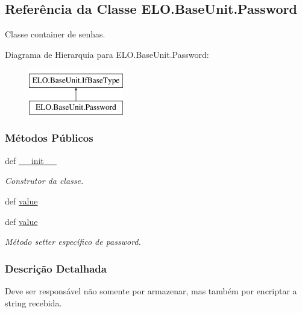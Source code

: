 \hypertarget{classELO_1_1BaseUnit_1_1Password}{\subsection{Referência da Classe E\-L\-O.\-Base\-Unit.\-Password}
\label{classELO_1_1BaseUnit_1_1Password}
}


Classe container de senhas.  


Diagrama de Hierarquia para E\-L\-O.\-Base\-Unit.\-Password\-:\begin{figure}[H]
\begin{center}
\leavevmode
\includegraphics[height=2.000000cm]{d4/df5/classELO_1_1BaseUnit_1_1Password}
\end{center}
\end{figure}
\subsubsection*{Métodos Públicos}
\begin{DoxyCompactItemize}
\item 
def \hyperlink{classELO_1_1BaseUnit_1_1Password_a01568369a90b21117ba3beb05cbf9dfe}{\-\_\-\-\_\-init\-\_\-\-\_\-}
\begin{DoxyCompactList}\small\item\em Construtor da classe. \end{DoxyCompactList}\item 
def \hyperlink{classELO_1_1BaseUnit_1_1Password_a42dcd63788a2eed3780c39f368356546}{value}
\item 
def \hyperlink{classELO_1_1BaseUnit_1_1Password_a42dcd63788a2eed3780c39f368356546}{value}
\begin{DoxyCompactList}\small\item\em Método setter específico de password. \end{DoxyCompactList}\end{DoxyCompactItemize}


\subsubsection{Descrição Detalhada}
Deve ser responsável não somente por armazenar, mas também por encriptar a string recebida. 

